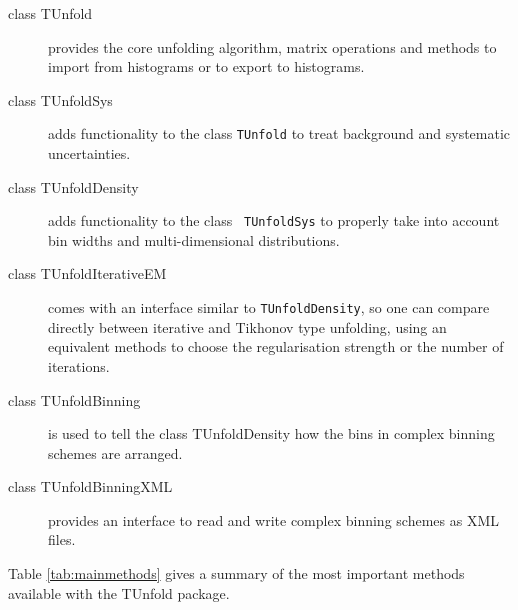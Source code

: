 \documentclass[12pt]{article}
\begin{document}
\begin{description}
\item[class TUnfold] provides the core unfolding algorithm, matrix
  operations and methods to import from histograms or to export to
  histograms.
\item[class TUnfoldSys] adds functionality to the class {\tt TUnfold}
  to treat background and systematic uncertainties.
\item[class TUnfoldDensity] adds functionality to the class {\tt
    TUnfoldSys} to properly take into account bin widths and
  multi-dimensional distributions.
\item[class TUnfoldIterativeEM] comes with an interface similar to
  {\tt TUnfoldDensity}, so one can compare directly between iterative
  and Tikhonov type unfolding, using an equivalent methods to choose
  the regularisation strength or the number of iterations.
\item[class TUnfoldBinning] is used to tell the class TUnfoldDensity
  how the bins in complex binning schemes are arranged.
\item[class TUnfoldBinningXML] provides an interface to read and write complex binning schemes as XML files.
\end{description}
Table \ref{tab:mainmethods} gives a summary of the most important methods
available with the TUnfold package.
\end{document}
